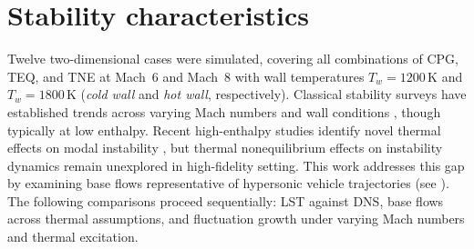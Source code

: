 

\section{Stability characteristics}

Twelve two-dimensional cases were simulated, covering all combinations of \gls{CPG}, \gls{TEQ}, and \gls{TNE} at Mach~6 and Mach~8 with wall temperatures $T_w=1200\,\mathrm{K}$ and $T_w=1800\,\mathrm{K}$ (\emph{cold wall} and \emph{hot wall}, respectively). Classical stability surveys have established trends across varying Mach numbers and wall conditions \citep{Mack1969,Mack1984,Malik1989,MasadEtAl1992}, though typically at low enthalpy. Recent high-enthalpy studies identify novel thermal effects on modal instability \citep{Bitter2015}, but thermal nonequilibrium effects on instability dynamics remain unexplored in high-fidelity setting. This work addresses this gap by examining base flows representative of hypersonic vehicle trajectories (see ). The following comparisons proceed sequentially: \gls{LST} against \gls{DNS}, base flows across thermal assumptions, and fluctuation growth under varying Mach numbers and thermal excitation.


